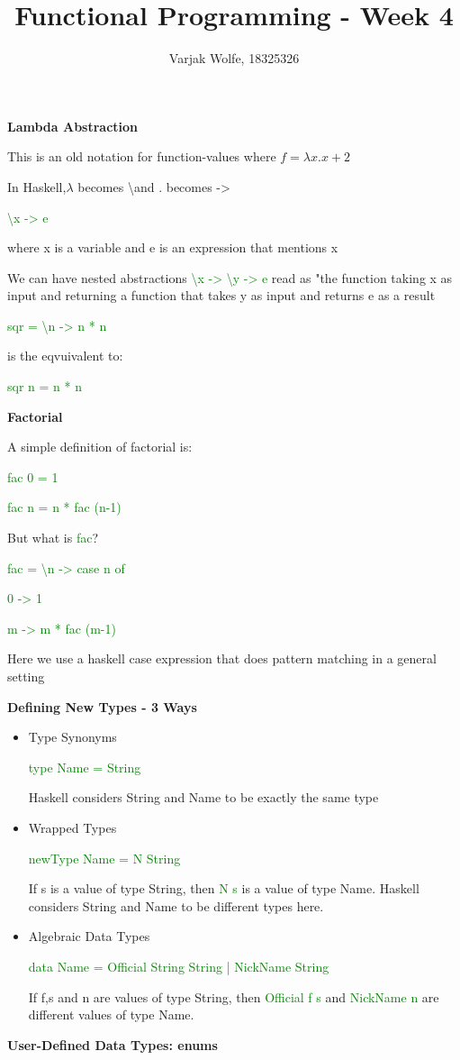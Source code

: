 \documentclass{article}
\title{Functional Programming - Week 4}
\author{Varjak Wolfe, 18325326}
\begin{document}
\textbf{Lambda Abstraction}

This is an old notation for function-values where $f = \lambda x . x + 2$

In Haskell,$\lambda$ becomes \textbackslash and . becomes ->

\textcolor{green}{\textbackslash x -> e}

where x is a variable and e is an expression that mentions x

We can have nested abstractions \textcolor{green}{\textbackslash x -> \textbackslash y -> e} read as "the function taking x as input and returning a function that takes y as input and returns e as a result

\textcolor{green}{sqr = \textbackslash n -> n * n} 

is the eqvuivalent to:

\textcolor{green}{sqr  n = n * n}


\textbf{Factorial}

A simple definition of factorial is:

\textcolor{green}{fac  0 = 1}

\textcolor{green}{fac  n = n * fac  (n-1)}

But what is \textcolor{green}{fac}?

\textcolor{green}{fac = \textbackslash n -> case n of}

\textcolor{green}{0 -> 1}

\textcolor{green}{m -> m * fac  (m-1)}

Here we use a haskell case expression that does pattern matching in a general setting


\textbf{Defining New Types - 3 Ways}

\begin{itemize}
\item Type Synonyms

\textcolor{green}{type Name = String}

Haskell considers String and Name to be exactly the same type
\item Wrapped Types

\textcolor{green}{newType Name = N String}

If s is a value of type String, then \textcolor{green}{N  s} is a value of type Name. Haskell considers String and Name to be different types here.
\item Algebraic Data Types

\textcolor{green}{data Name = Official String String  |  NickName String}

If f,s and n are values of type String, then \textcolor{green}{Official  f  s} and \textcolor{green}{NickName  n} are different values of type Name.

\end{itemize}
\textbf{User-Defined Data Types: enums}
\end{document}
